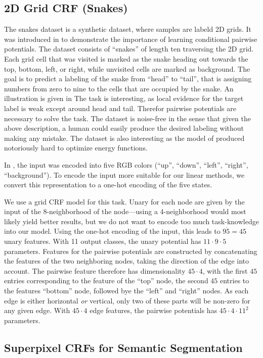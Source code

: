\subsection{2D Grid CRF (Snakes)}
The snakes dataset is a synthetic dataset, where samples are labeld 2D grids.
It was introduced in \citet{nowozin2011decision} to demonstrate the importance
of learning conditional pairwise potentials. The dataset consists of ``snakes''
of length ten traversing the 2D grid. Each grid cell that was visited is marked
as the snake heading out towards the top, bottom, left, or right, while
unvisited cells are marked as background.  The goal is to predict a labeling of
the snake from ``head'' to ``tail'', that is assigning numbers from zero to
nine to the cells that are occupied by the snake.  An illustration is given in
The task is interesting, as local evidence for the target label is weak except
around head and tail. Therefor pairwise potentials are necessary to solve the
task. The dataset is noise-free in the sense that given the above description, a
human could easily produce the desired labeling without making any mistake.
The dataset is also interesting as the model of \citet{nowozin2011decision} produced
notoriously hard to optimize energy functions.

In \citet{nowozin2011decision}, the input was encoded into five RGB colors
(``up'', ``down'', ``left'', ``right'', ``background'').  To encode the input
more suitable for our linear methods, we convert this representation to a
one-hot encoding of the five states.

We use a grid CRF model for this task. Unary for each node are given by the
input of the 8-neighborhood of the node---using a 4-neighborhood would most
likely yield better results, but we do not want to encode too much
task-knowledge into our model.
Using the one-hot encoding of the input, this leads to $9 \dot 5 = 45$ unary features.
With 11 output classes, the unary potential has $11 \cdot 9 \cdot 5$ parameters.
Features for the pairwise potentials are constructed by concatenating the features
of the two neighboring nodes, taking the direction of the edge into account.
The pairwise feature therefore has dimensionality $45 \cdot 4$, with the first
$45$ entries corresponding to the feature of the ``top'' node, the second $45$
entries to the features ``bottom'' node, followed bye the ``left'' and
``right'' nodes. As each edge is either horizontal \emph{or} vertical, only two
of these parts will be non-zero for any given edge.  With $45 \cdot 4$ edge
features, the pairwise potentials has $45 \cdot 4 \cdot 11^2$ parameters.


\subsection{Superpixel CRFs for Semantic Segmentation}

